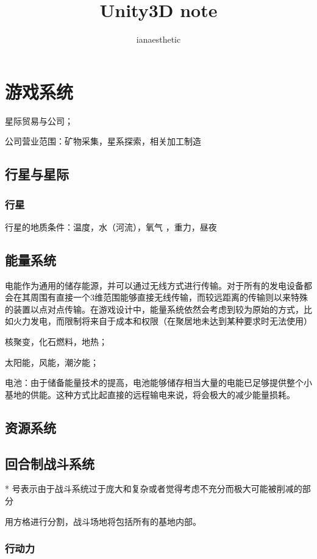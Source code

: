 \documentclass[10pt, a4paper]{article}
\author{ianaesthetic}
\title{Unity3D note}
\begin{document}
    
\section*{游戏系统}

    星际贸易与公司；

    公司营业范围：矿物采集，星系探索，相关加工制造

    \subsection*{行星与星际}

        \subsubsection*{行星}
            行星的地质条件：温度，水（河流），氧气 ，重力，昼夜

    \subsection*{能量系统}
        电能作为通用的储存能源，并可以通过无线方式进行传输。对于所有的发电设备都会在其周围有直接一个3维范围能够直接无线传输，而较远距离的传输则以来特殊的装置以点对点传输。在游戏设计中，能量系统依然会考虑到较为原始的方式，比如火力发电，而限制将来自于成本和权限（在聚居地未达到某种要求时无法使用）

        核聚变，化石燃料，地热；

        太阳能，风能，潮汐能；

        电池：由于储备能量技术的提高，电池能够储存相当大量的电能已足够提供整个小基地的供能。这种方式比起直接的远程输电来说，将会极大的减少能量损耗。

    \subsection*{资源系统}

    \subsection*{回合制战斗系统}

        * 号表示由于战斗系统过于庞大和复杂或者觉得考虑不充分而极大可能被削减的部分

        用方格进行分割，战斗场地将包括所有的基地内部。

        \subsubsection*{行动力}
\end{document}
